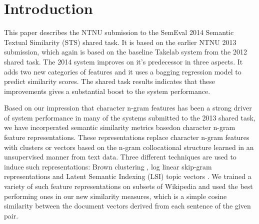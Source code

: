\section{Introduction}
\label{intro}


This paper describes the NTNU submission to the SemEval 2014 Semantic Textual Similarity (STS) shared task. It is based on the earlier NTNU 2013 submission, which again is based on the baseline Takelab system from the 2012 shared task. The 2014 system improves on it's predecessor in three aspects. It adds two new categories of features and it uses a bagging regression model to predict similarity scores. The shared task results indicates that these improvements gives a substantial boost to the system performance.


Based on our impression that character n-gram features has been a strong driver of system performance in many of the systems submitted to the 2013 shared task, we have incorperated semantic similarity metrics basedon character n-gram feature representations. These representations replace character n-gram features with clusters or vectors based on the n-gram collocational structure learned in an unsupervised manner from text data. Three different techniques are used to induce such representations: Brown clustering \cite{brown1992class}, log linear skip-gram representations \cite{mikolov2013efficient} and Latent Semantic Indexing (LSI) topic vectors \cite{deerwester1990indexing}. We trained a variety of such feature representations on subsets of Wikipedia and used the best performing ones in our new similarity measures, which is a simple cosine similarity between the document vectors derived from each sentence of the given pair.
